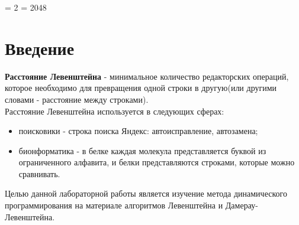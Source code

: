 \documentclass[12pt,a4paper,oneside]{report}
\begin{document}
\newcommand{\specchapter}[1]{\chapter*{#1}\addcontentsline{toc}{chapter}{#1}}
\newcommand{\specsection}[1]{\section*{#1}\addcontentsline{toc}{section}{#1}}
\newcommand{\specsubsection}[1]{\subsection*{#1}\addcontentsline{toc}{subsection}{#1}}



\setcounter{tocdepth}{4} %
\righthyphenmin = 2
\tolerance = 2048


\thispagestyle{empty}

\begin{titlepage}
	
\end{titlepage}
\newpage

\renewcommand*\contentsname{Оглавление}
\tableofcontents
\setcounter{page}{1}
\newpage

\makeatletter 
\renewcommand{\figurename}{Рисунок}
\renewcommand{\thefigure}{\@arabic\c@figure}
\makeatother

\setcounter{figure}{0}

\chapter*{Введение}
\qquad\textbf{Расстояние Левенштейна} - минимальное количество редакторских операций, которое необходимо для превращения одной строки в другую(или другими словами - расстояние между строками).\\

Расстояние Левенштейна используется в следующих сферах:
\begin{itemize}
	\item поисковики - строка поиска Яндекс: автоисправление, автозамена;
	\item бионформатика - в белке каждая молекула представляется буквой из ограниченного алфавита, и белки представляются строками, которые можно сравнивать.
\end{itemize}


Целью данной лабораторной работы является изучение метода динамического программирования на материале алгоритмов
Левенштейна и Дамерау-Левенштейна. \\
\end{document}

